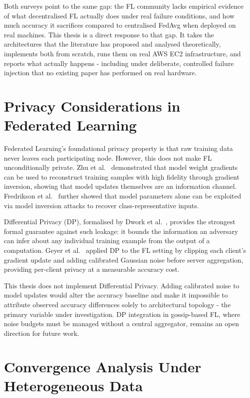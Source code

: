 \documentclass[12pt]{report}
\begin{document}
Both surveys point to the same gap: the FL community lacks empirical evidence of
what decentralised FL actually does under real failure conditions, and how much
accuracy it sacrifices compared to centralised FedAvg when deployed on real
machines. This thesis is a direct response to that gap. It takes the architectures
that the literature has proposed and analysed theoretically, implements both from
scratch, runs them on real AWS EC2 infrastructure, and reports what actually
happens - including under deliberate, controlled failure injection that no
existing paper has performed on real hardware.

\section{Privacy Considerations in Federated Learning}

Federated Learning's foundational privacy property is that raw training data
never leaves each participating node. However, this does not make FL
unconditionally private. Zhu et al.~\cite{zhu2019} demonstrated that model
weight gradients can be used to reconstruct training samples with high fidelity
through gradient inversion, showing that model updates themselves are an
information channel. Fredrikson et al.~\cite{fredrikson2015} further showed that
model parameters alone can be exploited via model inversion attacks to recover
class-representative inputs.

Differential Privacy (DP), formalised by Dwork et al.~\cite{dwork2006}, provides
the strongest formal guarantee against such leakage: it bounds the information
an adversary can infer about any individual training example from the output of
a computation. Geyer et al.~\cite{geyer2017} applied DP to the FL setting by
clipping each client's gradient update and adding calibrated Gaussian noise
before server aggregation, providing per-client privacy at a measurable accuracy
cost.

This thesis does not implement Differential Privacy. Adding calibrated noise to
model updates would alter the accuracy baseline and make it impossible to
attribute observed accuracy differences solely to architectural topology -
the primary variable under investigation. DP integration in gossip-based FL,
where noise budgets must be managed without a central aggregator, remains an
open direction for future work.

\section{Convergence Analysis Under Heterogeneous Data}
\end{document}
